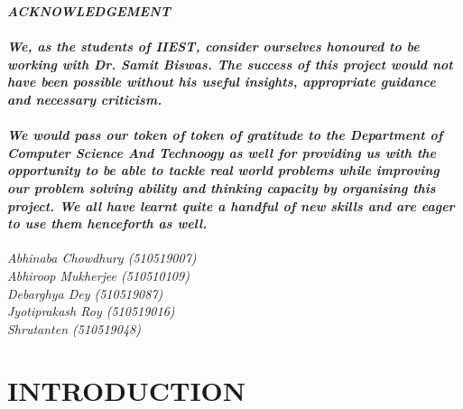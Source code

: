 \documentclass[a4paper]{article}
\begin{document}
\begin{titlepage}
    \begin{center}
        {\Large{\bf{\textit{ACKNOWLEDGEMENT}}\\[2cm]}}
    \end{center}


    \paragraph{\normalfont\textit{\indent We, as the students of IIEST, consider ourselves honoured to be working with Dr. Samit Biswas.
            The success of this project would not have been possible without his useful insights,
            appropriate guidance and necessary criticism.}}
    \paragraph{\normalfont\textit{\indent We would pass our token of token of gratitude to the Department of Computer Science And Technoogy as well for providing
            us with the opportunity to be able to tackle real world problems while improving
            our problem solving ability and thinking capacity by organising this project. We all have
            learnt quite a handful of new skills and are eager to use them henceforth as well.}}

    \begin{flushright}
	   \vspace{3cm}
        \textit{Abhinaba Chowdhury (510519007)\\
            Abhiroop Mukherjee (510510109)\\
            Debarghya Dey (510519087)\\
            Jyotiprakash Roy (510519016)\\
            Shrutanten (510519048)}

    \end{flushright}
\end{titlepage}

\setcounter{page}{1}
\newpage
\setcounter{tocdepth}{2} %
\tableofcontents
\newpage
\listoffigures
\newpage

\setcounter{page}{1}

\section{INTRODUCTION}
\end{document}

